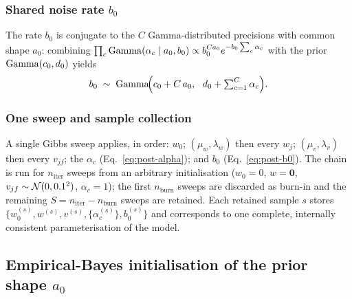\subsubsection{Shared noise rate $b_0$}
The rate $b_0$ is conjugate to the $C$ Gamma-distributed precisions with common
shape $a_0$: combining $\prod_c \mathrm{Gamma}(\alpha_c\mid a_0,b_0)\propto
b_0^{C a_0}e^{-b_0\sum_c\alpha_c}$ with the prior $\mathrm{Gamma}(c_0,d_0)$ yields
\begin{equation}
  b_0 \;\sim\; \Gam\!\Big(c_0+C\,a_0,\ \ d_0+\textstyle\sum_{c=1}^{C}\alpha_c\Big).
  \label{eq:post-b0}
\end{equation}

\subsubsection{One sweep and sample collection}
A single Gibbs sweep applies, in order: $w_0$; $(\mu_w,\lambda_w)$ then every
$w_j$; $(\mu_v,\lambda_v)$ then every $v_{jf}$; the $\alpha_c$
(Eq.~\ref{eq:post-alpha}); and $b_0$ (Eq.~\ref{eq:post-b0}). The chain is run
for $n_{\mathrm{iter}}$ sweeps from an arbitrary initialisation
($w_0=0$, $w=\mathbf{0}$, $v_{jf}\sim\mathcal{N}(0,0.1^2)$, $\alpha_c=1$); the first
$n_{\mathrm{burn}}$ sweeps are discarded as burn-in and the remaining
$S=n_{\mathrm{iter}}-n_{\mathrm{burn}}$ sweeps are retained. Each retained sample
$s$ stores $\{w_0^{(s)},w^{(s)},v^{(s)},\{\alpha_c^{(s)}\},b_0^{(s)}\}$ and
corresponds to one complete, internally consistent parameterisation of the
model.

\subsection{Empirical-Bayes initialisation of the prior shape $a_0$}
\label{sec:eb}

